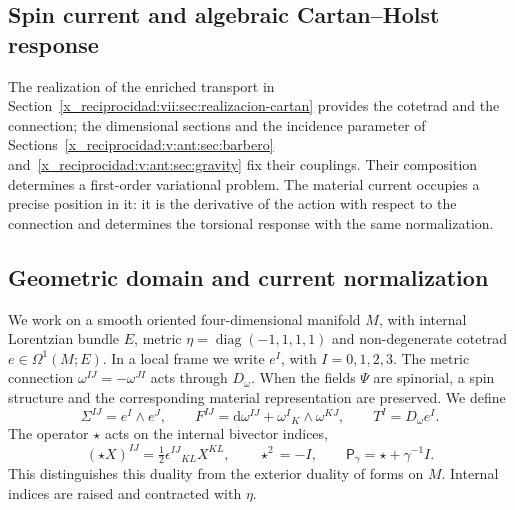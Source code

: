 \begin{HMTCompactSection}
\chapter{Spin current and algebraic Cartan--Holst response}
\label{x_reciprocidad:vii:sec:corriente-respuesta-cartan}

The realization of the enriched transport in Section~\ref{x_reciprocidad:vii:sec:realizacion-cartan} provides the cotetrad and the connection; the dimensional sections and the incidence parameter of Sections~\ref{x_reciprocidad:v:ant:sec:barbero} and~\ref{x_reciprocidad:v:ant:sec:gravity} fix their couplings. Their composition determines a first-order variational problem. The material current occupies a precise position in it: it is the derivative of the action with respect to the connection and determines the torsional response with the same normalization.

\section{Geometric domain and current normalization}
\label{x_reciprocidad:vii:subsec:dominio-corriente-cartan}

We work on a smooth oriented four-dimensional manifold \(M\), with internal Lorentzian bundle \(E\), metric \(\eta=\operatorname{diag}(-1,1,1,1)\) and non-degenerate cotetrad \(e\in\Omega^1(M;E)\). In a local frame we write \(e^I\), with \(I=0,1,2,3\). The metric connection \(\omega^{IJ}=-\omega^{JI}\) acts through \(D_\omega\). When the fields \(\Psi\) are spinorial, a spin structure and the corresponding material representation are preserved. We define
\begin{equation}
 \Sigma^{IJ}=e^I\wedge e^J,\qquad
 F^{IJ}=\mathrm d\omega^{IJ}+\omega^I{}_{K}\wedge\omega^{KJ},
 \qquad T^I=D_\omega e^I.
 \label{x_reciprocidad:vii:eq:campos-cartan}
\end{equation}
The operator \(\star\) acts on the internal bivector indices,
\begin{equation}
 (\star X)^{IJ}=\tfrac12\epsilon^{IJ}{}_{KL}X^{KL},
 \qquad \star^2=-I,\qquad
 \mathsf P_\gamma=\star+\gamma^{-1}I.
 \label{x_reciprocidad:vii:eq:operador-holst}
\end{equation}
This distinguishes this duality from the exterior duality of forms on \(M\). Internal indices are raised and contracted with \(\eta\).


\end{HMTCompactSection}
